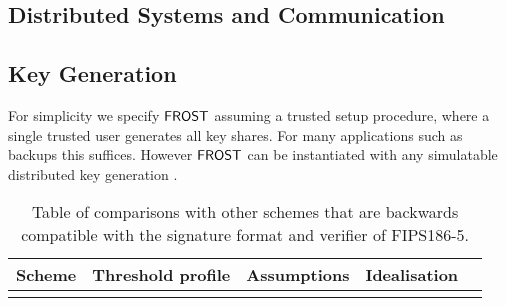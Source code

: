 \subsection{Distributed Systems and Communication}



\subsection{Key Generation}\label{section:comparisons:keygeneration}
For simplicity we specify $\mathsf{FROST}$ assuming a trusted setup procedure, where a single trusted user generates all key shares.
For many applications such as backups this suffices.
However  $\mathsf{FROST}$ can be instantiated with any simulatable distributed key generation \cite{}.


\begin{table}
	\centering
	\begin{tabular}{c c c c c}
		\toprule
		Scheme & Threshold profile & Assumptions & Idealisation & \\ \midrule
		& & & & \\ \bottomrule
	\end{tabular}
	\caption{Table of comparisons with other schemes that are backwards compatible with the signature format and verifier of FIPS186-5. }
\end{table}